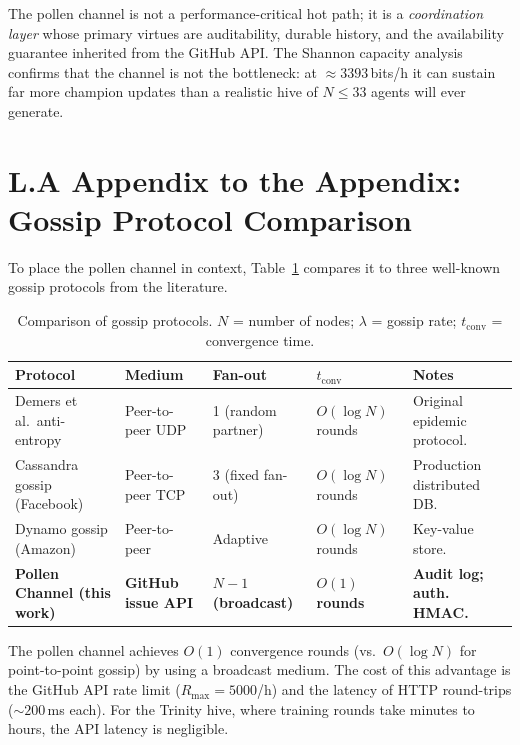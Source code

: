 The pollen channel is not a performance-critical hot path; it is a
\emph{coordination layer} whose primary virtues are auditability,
durable history, and the availability guarantee inherited from the
GitHub API.  The Shannon capacity analysis confirms that the channel
is not the bottleneck: at $\approx 3393$\,bits/h it can sustain far
more champion updates than a realistic hive of $N \leq 33$ agents
will ever generate.

\par\medskip\noindent\hrulefill\par\medskip

\section*{L.A \quad Appendix to the Appendix: Gossip Protocol Comparison}
\label{sec:appl-gossip-comparison}

To place the pollen channel in context, Table~\ref{tab:gossip}
compares it to three well-known gossip protocols from the literature.

\begin{table}[H]
\centering
\caption{Comparison of gossip protocols.  $N$ = number of nodes;
         $\lambda$ = gossip rate; $t_{\text{conv}}$ = convergence time.}
\label{tab:gossip}
\begin{tabular}{p{2.8cm}p{2.5cm}p{2.5cm}p{2.5cm}p{2.5cm}}
\hline
\textbf{Protocol} & \textbf{Medium} & \textbf{Fan-out} &
$t_{\text{conv}}$ & \textbf{Notes} \\
\hline
Demers et al.\ anti-entropy~\cite{demers1987epidemic} &
  Peer-to-peer UDP &
  1 (random partner) &
  $O(\log N)$ rounds &
  Original epidemic protocol. \\
Cassandra gossip (Facebook) &
  Peer-to-peer TCP &
  3 (fixed fan-out) &
  $O(\log N)$ rounds &
  Production distributed DB. \\
Dynamo gossip (Amazon) &
  Peer-to-peer &
  Adaptive &
  $O(\log N)$ rounds &
  Key-value store. \\
\textbf{Pollen Channel (this work)} &
  \textbf{GitHub issue API} &
  \textbf{$N-1$ (broadcast)} &
  \textbf{$O(1)$ rounds} &
  \textbf{Audit log; auth. HMAC.} \\
\hline
\end{tabular}
\end{table}

The pollen channel achieves $O(1)$ convergence rounds (vs.\ $O(\log N)$
for point-to-point gossip) by using a broadcast medium.  The cost of
this advantage is the GitHub API rate limit ($R_{\max} = 5000$/h)
and the latency of HTTP round-trips ($\sim 200$\,ms each).  For the
Trinity hive, where training rounds take minutes to hours, the API
latency is negligible.

